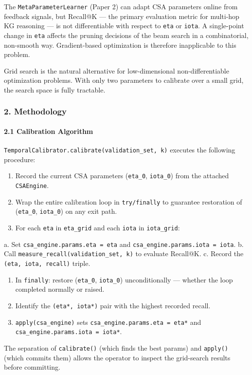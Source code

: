 The \texttt{MetaParameterLearner} (Paper 2) can adapt CSA parameters online from feedback signals, but Recall@K — the primary evaluation metric for multi-hop KG reasoning — is not diffe\-rentiable with respect to \texttt{eta} or \texttt{iota}. A single-point change in \texttt{eta} affects the pruning decisions of the beam search in a combi\-natorial, non-smooth way. Gradient-based optim\-ization is therefore inapp\-licable to this problem.

Grid search is the natural alternative for low-dimensional non-diffe\-rentiable optim\-ization problems. With only two parameters to calibrate over a small grid, the search space is fully tractable.

\subsubsection{2. Methodology}

\paragraph{2.1 Calibration Algorithm}
\texttt{TemporalCalibrator.calibrate(validation\_set, k)} executes the following procedure:

\begin{enumerate}
\item Record the current CSA parameters (\texttt{eta\_0}, \texttt{iota\_0}) from the attached \texttt{CSAEngine}.
\item Wrap the entire calibration loop in \texttt{try/finally} to guarantee restoration of (\texttt{eta\_0}, \texttt{iota\_0}) on any exit path.
\item For each \texttt{eta} in \texttt{eta\_grid} and each \texttt{iota} in \texttt{iota\_grid}:
\end{enumerate}
   a. Set \texttt{csa\_engine.params.eta = eta} and \texttt{csa\_engine.params.iota = iota}.
   b. Call \texttt{measure\_recall(validation\_set, k)} to evaluate Recall@K.
   c. Record the \texttt{(eta, iota, recall)} triple.
\begin{enumerate}
\item In \texttt{finally}: restore (\texttt{eta\_0}, \texttt{iota\_0}) uncon\-ditionally — whether the loop completed normally or raised.
\item Identify the \texttt{(eta*, iota*)} pair with the highest recorded recall.
\item \texttt{apply(csa\_engine)} sets \texttt{csa\_engine.params.eta = eta*} and \texttt{csa\_engine.params.iota = iota*}.

\end{enumerate}
The separation of \texttt{calibrate()} (which finds the best params) and \texttt{apply()} (which commits them) allows the operator to inspect the grid-search results before committing.

